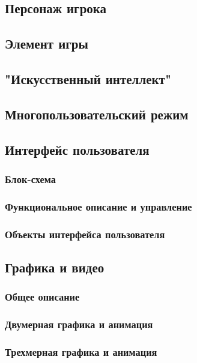 \documentclass{article}
\begin{document}
\subsection{Персонаж игрока}

\subsection{Элемент игры}

\subsection{"Искусственный интеллект"}

\subsection{Многопользовательский режим}

\subsection{Интерфейс пользователя}

\subsubsection{Блок-схема}
\subsubsection{Функциональное описание и управление}
\subsubsection{Объекты интерфейса пользователя}

\subsection{Графика и видео}

\subsubsection{Общее описание}
\subsubsection{Двумерная графика и анимация}
\subsubsection{Трехмерная графика и анимация}
\end{document}
